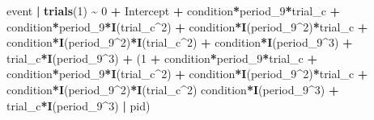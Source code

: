 \documentclass[
  man,floatsintext]{apa6}
\newenvironment{Shaded}{\begin{snugshade}}{\end{snugshade}}
\newcommand{\DecValTok}[1]{\textcolor[rgb]{0.00,0.00,0.81}{#1}}
\newcommand{\FunctionTok}[1]{\textcolor[rgb]{0.13,0.29,0.53}{\textbf{#1}}}
\newcommand{\NormalTok}[1]{#1}
\newcommand{\SpecialCharTok}[1]{\textcolor[rgb]{0.81,0.36,0.00}{\textbf{#1}}}
\begin{document}
\begin{Shaded}
\begin{Highlighting}[]
\NormalTok{event }\SpecialCharTok{|} \FunctionTok{trials}\NormalTok{(}\DecValTok{1}\NormalTok{) }\SpecialCharTok{\textasciitilde{}} \DecValTok{0} \SpecialCharTok{+}\NormalTok{ Intercept }\SpecialCharTok{+} 
\NormalTok{                           condition}\SpecialCharTok{*}\NormalTok{period\_9}\SpecialCharTok{*}\NormalTok{trial\_c }\SpecialCharTok{+}  
\NormalTok{                           condition}\SpecialCharTok{*}\NormalTok{period\_9}\SpecialCharTok{*}\FunctionTok{I}\NormalTok{(trial\_c}\SpecialCharTok{\^{}}\DecValTok{2}\NormalTok{) }\SpecialCharTok{+}
\NormalTok{                           condition}\SpecialCharTok{*}\FunctionTok{I}\NormalTok{(period\_9}\SpecialCharTok{\^{}}\DecValTok{2}\NormalTok{)}\SpecialCharTok{*}\NormalTok{trial\_c }\SpecialCharTok{+} 
\NormalTok{                           condition}\SpecialCharTok{*}\FunctionTok{I}\NormalTok{(period\_9}\SpecialCharTok{\^{}}\DecValTok{2}\NormalTok{)}\SpecialCharTok{*}\FunctionTok{I}\NormalTok{(trial\_c}\SpecialCharTok{\^{}}\DecValTok{2}\NormalTok{) }\SpecialCharTok{+} 
\NormalTok{                           condition}\SpecialCharTok{*}\FunctionTok{I}\NormalTok{(period\_9}\SpecialCharTok{\^{}}\DecValTok{3}\NormalTok{) }\SpecialCharTok{+} 
\NormalTok{                           trial\_c}\SpecialCharTok{*}\FunctionTok{I}\NormalTok{(period\_9}\SpecialCharTok{\^{}}\DecValTok{3}\NormalTok{) }\SpecialCharTok{+} 
\NormalTok{                           (}\DecValTok{1} \SpecialCharTok{+}\NormalTok{  condition}\SpecialCharTok{*}\NormalTok{period\_9}\SpecialCharTok{*}\NormalTok{trial\_c }\SpecialCharTok{+} 
\NormalTok{                                 condition}\SpecialCharTok{*}\NormalTok{period\_9}\SpecialCharTok{*}\FunctionTok{I}\NormalTok{(trial\_c}\SpecialCharTok{\^{}}\DecValTok{2}\NormalTok{) }\SpecialCharTok{+}  
\NormalTok{                                 condition}\SpecialCharTok{*}\FunctionTok{I}\NormalTok{(period\_9}\SpecialCharTok{\^{}}\DecValTok{2}\NormalTok{)}\SpecialCharTok{*}\NormalTok{trial\_c }\SpecialCharTok{+} 
\NormalTok{                                 condition}\SpecialCharTok{*}\FunctionTok{I}\NormalTok{(period\_9}\SpecialCharTok{\^{}}\DecValTok{2}\NormalTok{)}\SpecialCharTok{*}\FunctionTok{I}\NormalTok{(trial\_c}\SpecialCharTok{\^{}}\DecValTok{2}\NormalTok{)   }
\NormalTok{                                 condition}\SpecialCharTok{*}\FunctionTok{I}\NormalTok{(period\_9}\SpecialCharTok{\^{}}\DecValTok{3}\NormalTok{) }\SpecialCharTok{+} 
\NormalTok{                                 trial\_c}\SpecialCharTok{*}\FunctionTok{I}\NormalTok{(period\_9}\SpecialCharTok{\^{}}\DecValTok{3}\NormalTok{) }\SpecialCharTok{|}\NormalTok{ pid)}
\end{Highlighting}
\end{Shaded}
\end{document}
